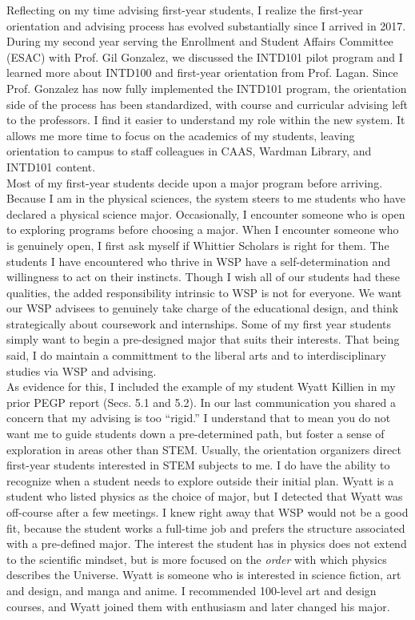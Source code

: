 \documentclass[../../main.tex]{subfiles}
\begin{document}
Reflecting on my time advising first-year students, I realize the first-year orientation and advising process has evolved substantially since I arrived in 2017.  During my second year serving the Enrollment and Student Affairs Committee (ESAC) with Prof. Gil Gonzalez, we discussed the INTD101 pilot program and I learned more about INTD100 and first-year orientation from Prof. Lagan.  Since Prof. Gonzalez has now fully implemented the INTD101 program, the orientation side of the process has been standardized, with course and curricular advising left to the professors.  I find it easier to understand my role within the new system.  It allows me more time to focus on the academics of my students, leaving orientation to campus to staff colleagues in CAAS, Wardman Library, and INTD101 content.  
\\
\vspace{0.15cm}
Most of my first-year students decide upon a major program before arriving.  Because I am in the physical sciences, the system steers to me students who have declared a physical science major.  Occasionally, I encounter someone who is open to exploring programs before choosing a major.  When I encounter someone who is genuinely open, I first ask myself if Whittier Scholars is right for them.  The students I have encountered who thrive in WSP have a self-determination and willingness to act on their instincts.  Though I wish all of our students had these qualities, the added responsibility intrinsic to WSP is not for everyone.  We want our WSP advisees to genuinely take charge of the educational design, and think strategically about coursework and internships.  Some of my first year students simply want to begin a pre-designed major that suits their interests.  That being said, I do maintain a committment to the liberal arts and to interdisciplinary studies via WSP and advising.
\\
\vspace{0.15cm}
As evidence for this, I included the example of my student Wyatt Killien in my prior PEGP report (Secs. 5.1 and 5.2).  In our last communication you shared a concern that my advising is too ``rigid.''  I understand that to mean you do not want me to guide students down a pre-determined path, but foster a sense of exploration in areas other than STEM.  Usually, the orientation organizers direct first-year students interested in STEM subjects to me.  I do have the ability to recognize when a student needs to explore outside their initial plan.  Wyatt is a student who listed physics as the choice of major, but I detected that Wyatt was off-course after a few meetings.  I knew right away that WSP would not be a good fit, because the student works a full-time job and prefers the structure associated with a pre-defined major.  The interest the student has in physics does not extend to the scientific mindset, but is more focused on the \textit{order} with which physics describes the Universe.  Wyatt is someone who is interested in science fiction, art and design, and manga and anime.  I recommended 100-level art and design courses, and Wyatt joined them with enthusiasm and later changed his major.  
\end{document}
